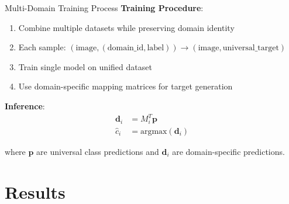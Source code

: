 \documentclass[aspectratio=169]{beamer}
\begin{document}
\begin{frame}{Multi-Domain Training Process}
    \textbf{Training Procedure}:
    \begin{enumerate}
        \item Combine multiple datasets while preserving domain identity
        \item Each sample: $(\text{image}, (\text{domain\_id}, \text{label})) \rightarrow (\text{image}, \text{universal\_target})$
        \item Train single model on unified dataset
        \item Use domain-specific mapping matrices for target generation
    \end{enumerate}

    \vspace{1em}

    \textbf{Inference}:
    \begin{align}
        \mathbf{d}_i & = M_i^T \mathbf{p}            \\
        \hat{c}_i    & = \text{argmax}(\mathbf{d}_i)
    \end{align}

    where $\mathbf{p}$ are universal class predictions and $\mathbf{d}_i$ are domain-specific predictions.
\end{frame}

\section{Results}
\end{document}
